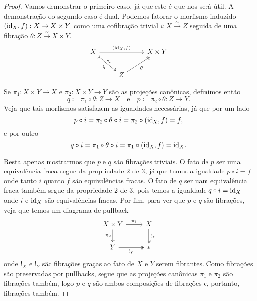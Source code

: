 \begin{proof}
  Vamos demonstrar o primeiro caso, já que este é que nos será útil.
  A demonstração do segundo caso é dual.
  Podemos fatorar o morfismo induzido $(\mathrm{id}_{X},f): X \to X \times Y$ como uma cofibração trivial $i: X \overset{\sim}{\to} Z$ seguida de uma fibração $\theta: Z \overset{\sim}{\to} X \times Y$.
  \begin{displaymath}
    \begin{tikzcd}
      X
      \arrow[rr, "{(\id_{X},f)}"]
      \arrow[rd, tail, "\sim" {sloped}, "\lambda" {swap}]
      & & X \times Y
      \\ & Z
      \arrow[ru, two heads, "\theta" swap]
    \end{tikzcd}
  \end{displaymath}

  Se $\pi_{1}: X \times Y \to X$ e $\pi_{2}: X \times Y \to Y$ são as projeções canônicas, definimos então
  \begin{displaymath}
    q \coloneqq \pi_{1} \circ \theta: Z \to X \quad \text{e} \quad p \coloneqq \pi_{2} \circ \theta: Z \to Y.
  \end{displaymath}
  Veja que tais morfismos satisfazem as igualdades necessárias, já que por um lado
  \begin{displaymath}
    p \circ i = \pi_{2} \circ \theta \circ i = \pi_{2} \circ (\mathrm{id}_{X},f) = f,
  \end{displaymath}
  e por outro
  \begin{displaymath}
    q \circ i = \pi_{1} \circ \theta \circ i = \pi_{1} \circ (\mathrm{id}_{X},f) = \mathrm{id}_{X}.
  \end{displaymath}

  Resta apenas mostrarmos que $p$ e $q$ são fibrações triviais.
  O fato de $p$ ser uma equivalência fraca segue da propriedade 2-de-3, já que temos a igualdade $p \circ i = f$ onde tanto $i$ quanto $f$ são equivalências fracas.
  O fato de $q$ ser uam equivalência fraca também segue da propriedade 2-de-3, pois temos a igualdade $q \circ i = \mathrm{id}_{X}$ onde $i$ e $\mathrm{id}_{X}$ são equivalências fracas.
  Por fim, para ver que $p$ e $q$ são fibrações, veja que temos um diagrama de pullback
  \begin{displaymath}
    \begin{tikzcd}
      X \times Y
      \arrow[r, "\pi_{1}"]
      \arrow[d, "\pi_{2}" swap]
      & X
      \arrow[d, two heads, "!_{X}"]
      \\ Y
      \arrow[r, two heads, "!_{Y}" swap]
      & *
    \end{tikzcd}
  \end{displaymath}
  onde $!_{X}$ e $!_{Y}$ são fibrações graças ao fato de $X$ e $Y$ serem fibrantes.
  Como fibrações são preservadas por pullbacks, segue que as projeções canônicas $\pi_{1}$ e $\pi_{2}$ são fibrações também, logo $p$ e $q$ são ambos composições de fibrações e, portanto, fibrações também.
\end{proof}

